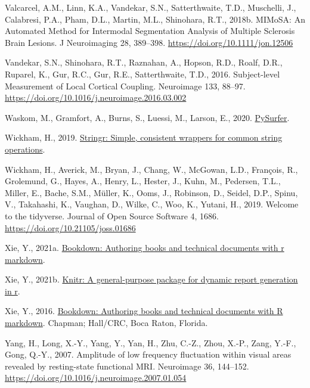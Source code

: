 \documentclass[
  12pt,
]{article}
\newlength{\cslhangindent}
\newlength{\cslentryspacingunit} %
\newenvironment{CSLReferences}[2] %
 {%
  \setlength{\parindent}{0pt}
  \ifodd #1
  \let\oldpar\par
  \def\par{\hangindent=\cslhangindent\oldpar}
  \fi
  \setlength{\parskip}{#2\cslentryspacingunit}
 }%
 {}
\begin{document}
\begin{CSLReferences}{1}{0}
\leavevmode{}%
Valcarcel, A.M., Linn, K.A., Vandekar, S.N., Satterthwaite, T.D., Muschelli, J., Calabresi, P.A., Pham, D.L., Martin, M.L., Shinohara, R.T., 2018b. {MIMoSA}: {An Automated Method} for {Intermodal Segmentation Analysis} of {Multiple Sclerosis Brain Lesions}. J Neuroimaging 28, 389--398. \url{https://doi.org/10.1111/jon.12506}

\leavevmode{}%
Vandekar, S.N., Shinohara, R.T., Raznahan, A., Hopson, R.D., Roalf, D.R., Ruparel, K., Gur, R.C., Gur, R.E., Satterthwaite, T.D., 2016. Subject-level {Measurement} of {Local Cortical Coupling}. Neuroimage 133, 88--97. \url{https://doi.org/10.1016/j.neuroimage.2016.03.002}

\leavevmode{}%
Waskom, M., Gramfort, A., Burns, S., Luessi, M., Larson, E., 2020. \href{https://pysurfer.github.io/index.html}{PySurfer}.

\leavevmode{}%
Wickham, H., 2019. \href{https://CRAN.R-project.org/package=stringr}{Stringr: Simple, consistent wrappers for common string operations}.

\leavevmode{}%
Wickham, H., Averick, M., Bryan, J., Chang, W., McGowan, L.D., François, R., Grolemund, G., Hayes, A., Henry, L., Hester, J., Kuhn, M., Pedersen, T.L., Miller, E., Bache, S.M., Müller, K., Ooms, J., Robinson, D., Seidel, D.P., Spinu, V., Takahashi, K., Vaughan, D., Wilke, C., Woo, K., Yutani, H., 2019. Welcome to the {tidyverse}. Journal of Open Source Software 4, 1686. \url{https://doi.org/10.21105/joss.01686}

\leavevmode{}%
Xie, Y., 2021a. \href{https://CRAN.R-project.org/package=bookdown}{Bookdown: Authoring books and technical documents with r markdown}.

\leavevmode{}%
Xie, Y., 2021b. \href{https://yihui.org/knitr/}{Knitr: A general-purpose package for dynamic report generation in r}.

\leavevmode{}%
Xie, Y., 2016. \href{https://bookdown.org/yihui/bookdown}{Bookdown: Authoring books and technical documents with {R} markdown}. Chapman; Hall/CRC, Boca Raton, Florida.

\leavevmode{}%
Yang, H., Long, X.-Y., Yang, Y., Yan, H., Zhu, C.-Z., Zhou, X.-P., Zang, Y.-F., Gong, Q.-Y., 2007. Amplitude of low frequency fluctuation within visual areas revealed by resting-state functional {MRI}. Neuroimage 36, 144--152. \url{https://doi.org/10.1016/j.neuroimage.2007.01.054}


\end{CSLReferences}
\end{document}
